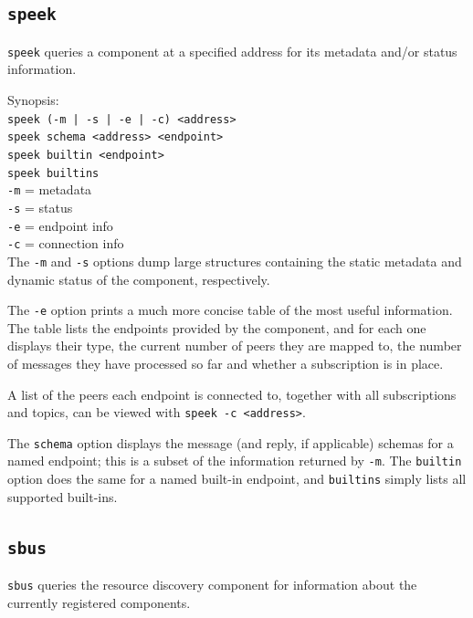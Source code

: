 \documentclass[12pt,a4paper,twoside]{article}
\renewcommand{\_}{\texttt{\symbol{95}}}
\begin{document}
\subsection{\texttt{speek}}

\verb^speek^ queries a component at a specified address for
its metadata and/or status information.

Synopsis:\\
\verb^speek (-m | -s | -e | -c) <address>^\\
\verb^speek schema <address> <endpoint>^\\
\verb^speek builtin <endpoint>^\\
\verb^speek builtins^\\
\hspace*{15mm}\verb^-m^ = metadata\\
\hspace*{15mm}\verb^-s^ = status\\
\hspace*{15mm}\verb^-e^ = endpoint info\\
\hspace*{15mm}\verb^-c^ = connection info\\

The \verb^-m^ and \verb^-s^ options dump large structures containing the
static metadata and dynamic status of the component, respectively.

The \verb^-e^ option prints a much more concise table of the
most useful information. The table lists the endpoints provided
by the component, and for each one displays their type, the
current number of peers they are mapped to, the number of
messages they have processed so far and whether a subscription
is in place.

A list of the peers each endpoint is connected to, together with all
subscriptions and topics, can be viewed with \verb^speek -c <address>^.

The \verb^schema^ option displays the message (and reply, if applicable)
schemas for a named endpoint; this is a subset of the information
returned by \verb^-m^. The \verb^builtin^ option does the same for a
named built-in endpoint, and \verb^builtins^ simply lists all
supported built-ins.

\subsection{\texttt{sbus}}

\verb^sbus^ queries the resource discovery component for information
about the currently registered components.
\end{document}
